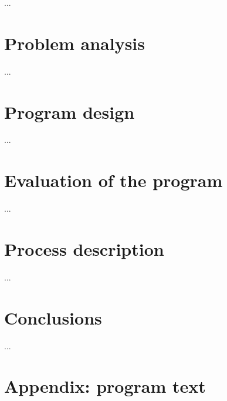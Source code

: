 \documentclass[a4paper]{report}
\begin{document}
...

\chapter{Problem analysis}

...

\chapter{Program design}

...

\chapter{Evaluation of the program}

...

%

\chapter{Process description}

...

\chapter{Conclusions}

...

\chapter{Appendix: program text}


% 

%

%
\end{document}

